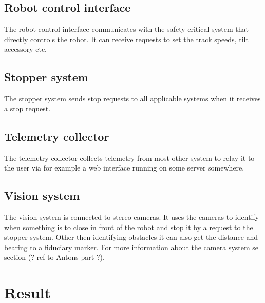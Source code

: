 \documentclass{article}
\begin{document}
\subsection{Robot control interface}
The robot control interface communicates with the safety critical system that directly controls the robot. It can receive requests to set the track speeds, tilt accessory etc.

\subsection{Stopper system}
The stopper system sends stop requests to all applicable systems when it receives a stop request.

\subsection{Telemetry collector}
The telemetry collector collects telemetry from most other system to relay it to the user via for example a web interface running on some server somewhere.

\subsection{Vision system}
\label{sec:software:last}
The vision system is connected to stereo cameras.
It uses the cameras to identify when something is to close in front of the robot and stop it by a request to the stopper system.
Other then identifying obstacles it can also get the distance and bearing to a fiduciary marker.
For more information about the camera system se section (? ref to Antons part ?).

\section{Result}
\label{sec:software:result}
\end{document}
